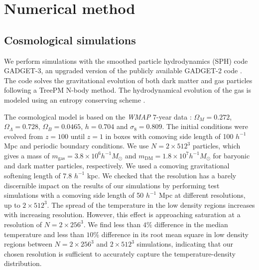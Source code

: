 \documentclass[numberedappendix]{emulateapj}
\begin{document}
\section{Numerical method}
\subsection{Cosmological simulations}
We perform simulations with the smoothed particle hydrodynamics (SPH) code \textsc{GADGET-3}, an upgraded version of the publicly available \textsc{GADGET-2} code \citep{2005MNRAS.364.1105S}. The code solves the gravitational evolution of both dark matter and gas particles following a TreePM N-body method. The hydrodynamical evolution of the gas is modeled using an entropy conserving scheme \citep{2002MNRAS.333..649S}.

The cosmological model is based on the \textit{WMAP} 7-year data \citep{2011ApJS..192...18K}: $\Omega_M=0.272$, $\Omega_{\Lambda}=0.728$, $\Omega_{B}= 0.0465$, $h=0.704$ and $\sigma_8=0.809$. The initial conditions were evolved from $z=100$ until $z=1$ in boxes with comoving side length of 100 $h^{-1}$ Mpc and periodic boundary conditions. We use $N= 2\times 512^3$ particles, which gives a mass of $m_\mathrm{gas}=3.8\times10^{6} h^{-1} M_{\odot}$ and $m_\mathrm{DM}=1.8\times 10^{7} h^{-1} M_{\odot}$ for baryonic and dark matter particles, respectively. We used a comoving gravitational softening length of 7.8 $h^{-1}$ kpc. We checked that the resolution has a barely discernible impact on the results of our simulations by performing test simulations with a comoving side length of 50 $h^{-1}$ Mpc at different resolutions, up to $2\times 512^3$. The spread of the temperature in the low density regions increases with increasing resolution. However, this effect is approaching saturation at a resolution of $N=2\times 256^3$. We find less than $4\%$ difference in the median temperature and less than $10\%$ difference in its root mean square in low density regions between $N=2\times 256^3$ and $2\times 512^3$ simulations, indicating that our chosen resolution is sufficient to accurately capture the temperature-density distribution. 
\end{document}
